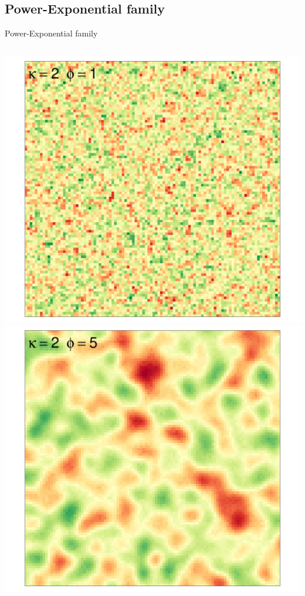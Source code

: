 \documentclass[
  ignorenonframetext,
]{beamer}
\begin{document}
\hypertarget{power-exponential-family-3}{%
\subsection{Power-Exponential family}\label{power-exponential-family-3}}

\begin{frame}{Power-Exponential family}
\small

\begin{columns}[T]
\begin{column}{0.33\textwidth}
\includegraphics{Lecture_1_files/figure-beamer/unnamed-chunk-17-1.pdf}
\includegraphics{Lecture_1_files/figure-beamer/unnamed-chunk-18-1.pdf}
\end{column}


\end{columns}
\end{frame}
\end{document}
